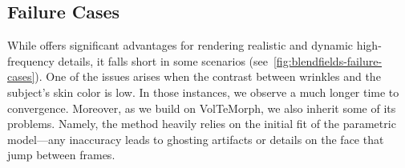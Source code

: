   \subsection{Failure Cases}
    \label{subsec:blendfields-failures}
    
    While \blendfields offers significant advantages for rendering realistic and
    dynamic high-frequency details, it falls short in some scenarios
    (see~\cref{fig:blendfields-failure-cases}).
    One of the issues arises when the contrast between wrinkles and the subject's
    skin color is low.
    In those instances, we observe a much longer time to convergence.
    Moreover, as we build \blendfields on VolTeMorph, we also inherit some of its
    problems.
    Namely, the method heavily relies on the initial fit of the parametric
    model---any inaccuracy leads to ghosting artifacts or details on the face that
    jump between frames.
